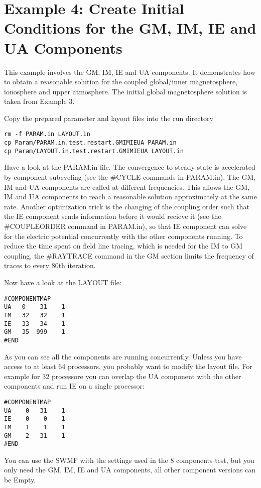 \section{
Example 4: Create Initial Conditions for the GM, IM, IE and UA Components}

This example involves the GM, IM, IE and UA components. It demonstrates
how to obtain a reasonable solution for the 
coupled global/inner magnetosphere, ionosphere and upper atmosphere.
The initial global magnetosphere solution is taken from Example 3.

Copy the prepared parameter and layout files into the run directory
\begin{verbatim}
rm -f PARAM.in LAYOUT.in
cp Param/PARAM.in.test.restart.GMIMIEUA PARAM.in
cp Param/LAYOUT.in.test.restart.GMIMIEUA LAYOUT.in
\end{verbatim}
Have a look at the PARAM.in file.
The convergence to steady state is accelerated by component subcycling
(see the \#CYCLE commands in PARAM.in).
The GM, IM and UA components are called at different frequencies.
This allows the GM, IM and UA components to reach a reasonable solution
approximately at the same rate. Another optimization trick is the changing of 
the coupling order such that the IE component sends information before
it would recieve it (see the \#COUPLEORDER command in PARAM.in),
so that IE component can solve for the electric potential concurrently with the
other components running. To reduce the time spent on field line
tracing, which is needed for the IM to GM coupling, the \#RAYTRACE command
in the GM section limits the frequency of traces to every 80th iteration.

Now have a look at the LAYOUT file:
\begin{verbatim}
#COMPONENTMAP
UA   0    31    1
IM   32   32    1
IE   33   34    1
GM   35  999    1
#END
\end{verbatim}
As you can see all the components are running concurrently.
Unless you have access to at least 64 processors, 
you probably want to modify the layout file.
For example for 32 processore you can overlap the UA component 
with the other components and run IE on a single processor:
\begin{verbatim}
#COMPONENTMAP
UA    0   31    1
IE    0    0    1
IM    1    1    1
GM    2   31    1
#END
\end{verbatim}
You can use the SWMF with the settings used in the 8 components test, 
but you only need the GM, IM, IE and UA components,
all other component versions can be Empty.


